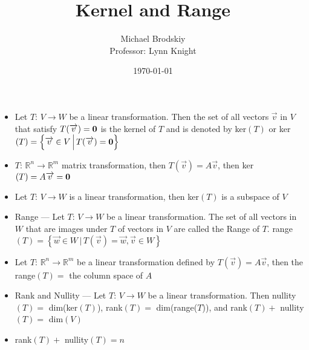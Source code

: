\documentclass[12pt]{article}
\title{Kernel and Range}
\date{\today}
\author{Michael Brodskiy\\ \small Professor: Lynn Knight}
\begin{document}
\maketitle

\begin{itemize}

  \item Let $T:\,V\rightarrow W$ be a linear transformation. Then the set of all vectors $\overrightarrow{v}$ in $V$ that satisfy $T(\overrightarrow{v})=\bold{0}$ is the kernel of $T$ and is denoted by ker$(T)$ or ker$(T)=\left\{ \overrightarrow{v}\in V\, \Big| \, T(\overrightarrow{v})=\bold{0} \right\}$

  \item $T:\,\mathbb{R}^n\rightarrow\mathbb{R}^m$ matrix transformation, then $T(\overrightarrow{v})=A\overrightarrow{v}$, then ker$(T)=A\overrightarrow{v}=\bold{0}$

  \item Let $T:\, V\rightarrow W$ is a linear transformation, then ker$(T)$ is a subspace of $V$

  \item Range — Let $T:\,V\rightarrow W$ be a linear transformation. The set of all vectors in $W$ that are images under $T$ of vectors in $V$ are called the Range of $T$. range$(T)=\left\{ \overrightarrow{w}\in W\,\Big|\, T(\overrightarrow{v})=\overrightarrow{w}, \overrightarrow{v}\in W \right\}$

  \item Let $T:\,\mathbb{R}^n\rightarrow\mathbb{R}^m$ be a linear transformation defined by $T(\overrightarrow{v})=A\overrightarrow{v}$, then the range$(T)=$ the column space of $A$

  \item Rank and Nullity — Let $T:\,V\rightarrow W$ be a linear transformation. Then nullity$(T)=$ dim(ker$(T)$), rank$(T)=$ dim(range($T$)), and rank$(T)+$ nullity$(T)=$ dim$(V)$

  \item rank$(T)+$ nullity$(T)=n$

\end{itemize}
\end{document}
